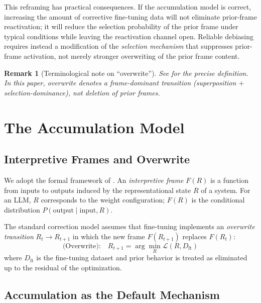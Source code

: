 \documentclass[12pt]{article}
\newtheorem{remark}{Remark}
\begin{document}
This reframing has practical consequences. If the accumulation model
is correct, increasing the amount of corrective fine-tuning data
will not eliminate prior-frame reactivation; it will reduce the
selection probability of the prior frame under typical conditions
while leaving the reactivation channel open. Reliable debiasing
requires instead a modification of the \emph{selection mechanism}
that suppresses prior-frame activation, not merely stronger
overwriting of the prior frame content.


\begin{remark}[Terminological note on ``overwrite'']
See \cite{minamoto2026overwrite} for the precise definition.
In this paper, \emph{overwrite} denotes a frame-dominant transition
(superposition $+$ selection-dominance), not deletion of prior frames.
\end{remark}

\section{The Accumulation Model}

\subsection{Interpretive Frames and Overwrite}

We adopt the formal framework of \cite{minamoto2026overwrite,
minamoto2026accum}. An \emph{interpretive frame} $F(R)$ is a function
from inputs to outputs induced by the representational state $R$ of a
system. For an LLM, $R$ corresponds to the weight configuration; $F(R)$
is the conditional distribution $P(\text{output} \mid \text{input}, R)$.

The standard correction model assumes that fine-tuning implements
an \emph{overwrite transition} $R_t \to R_{t+1}$ in which the new
frame $F(R_{t+1})$ replaces $F(R_t)$:
\[
\text{(Overwrite):} \quad R_{t+1} = \arg\min_{R} \mathcal{L}(R, D_{\mathrm{ft}})
\]
where $D_{\mathrm{ft}}$ is the fine-tuning dataset and prior behavior
is treated as eliminated up to the residual of the optimization.

\subsection{Accumulation as the Default Mechanism}
\end{document}
